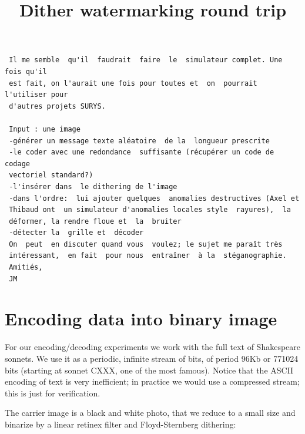 \title{Dither watermarking round trip}

 \begin{verbatim}
 Il me semble  qu'il  faudrait  faire  le  simulateur complet. Une fois qu'il
 est fait, on l'aurait une fois pour toutes et  on  pourrait l'utiliser pour
 d'autres projets SURYS.

 Input : une image
 -générer un message texte aléatoire  de la  longueur prescrite
 -le coder avec une redondance  suffisante (récupérer un code de codage
 vectoriel standard?)
 -l'insérer dans  le dithering de l'image
 -dans l'ordre:  lui ajouter quelques  anomalies destructives (Axel et
 Thibaud ont  un simulateur d'anomalies locales style  rayures),  la
 déformer, la rendre floue et  la  bruiter
 -détecter la  grille et  décoder
 On  peut  en discuter quand vous  voulez; le sujet me paraît très
 intéressant,  en fait  pour nous  entraîner  à la  stéganographie.
 Amitiés,
 JM
 \end{verbatim}


\section{Encoding data into binary image}

For our encoding/decoding experiments we work with the full text of
Shakespeare sonnets.  We use it as a periodic, infinite stream of bits, of
period 96Kb or 771024 bits (starting at sonnet CXXX, one of the most famous).
Notice that the ASCII encoding of text is very inefficient; in practice we
would use a compressed stream;  this is just for verification.

The carrier image is a black and white photo, that we reduce to a small size
and binarize by a linear retinex filter and Floyd-Sternberg dithering:

